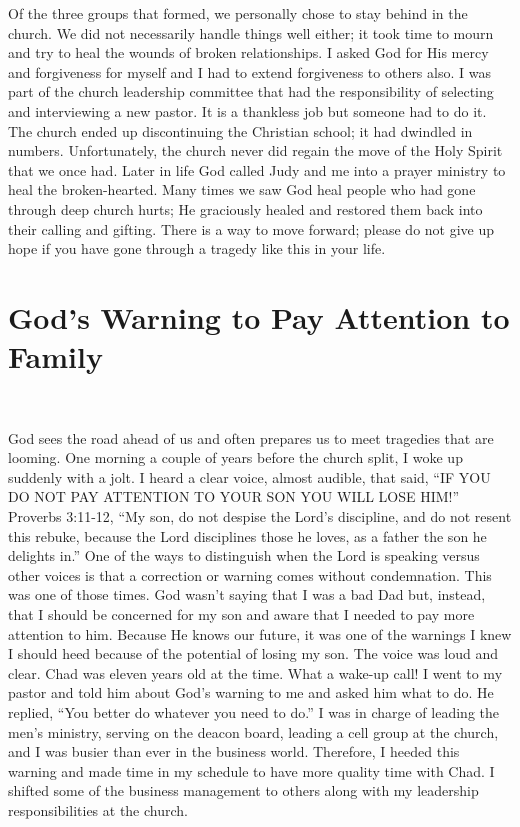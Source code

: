 \documentclass[oneside]{book}
\begin{document}
Of the three groups that formed, we personally chose to stay behind in the church. We did not necessarily handle things well either; it took time to mourn and try to heal the wounds of broken relationships. I asked God for His mercy and forgiveness for myself and I had to extend forgiveness to others also. I was part of the church leadership committee that had the responsibility of selecting and interviewing a new pastor. It is a thankless job but someone had to do it. The church ended up discontinuing the Christian school; it had dwindled in numbers. Unfortunately, the church never did regain the move of the Holy Spirit that we once had. Later in life God called Judy and me into a prayer ministry to heal the broken-hearted. Many times we saw God heal people who had gone through deep church hurts; He graciously healed and restored them back into their calling and gifting. There is a way to move forward; please do not give up hope if you have gone through a tragedy like this in your life.


\section{God's Warning to Pay Attention to Family}
\

God sees the road ahead of us and often prepares us to meet tragedies that are looming. One morning a couple of years before the church split, I woke up suddenly with a jolt. I heard a clear voice, almost audible, that said, “IF YOU DO NOT PAY ATTENTION TO YOUR SON YOU WILL LOSE HIM!” Proverbs 3:11-12, “My son, do not despise the Lord's discipline, and do not resent this rebuke, because the Lord disciplines those he loves, as a father the son he delights in.” One of the ways to distinguish when the Lord is speaking versus other voices is that a correction or warning comes without condemnation. This was one of those times. God wasn't saying that I was a bad Dad but, instead, that I should be concerned for my son and aware that I needed to pay more attention to him. Because He knows our future, it was one of the warnings I knew I should heed because of the potential of losing my son. The voice was loud and clear. Chad was eleven years old at the time. What a wake-up call! I went to my pastor and told him about God’s warning to me and asked him what to do. He replied, “You better do whatever you need to do.” I was in charge of leading the men's ministry, serving on the deacon board, leading a cell group at the church, and I was busier than ever in the business world. Therefore, I heeded this warning and made time in my schedule to have more quality time with Chad. I shifted some of the business management to others along with my leadership responsibilities at the church.
\end{document}
